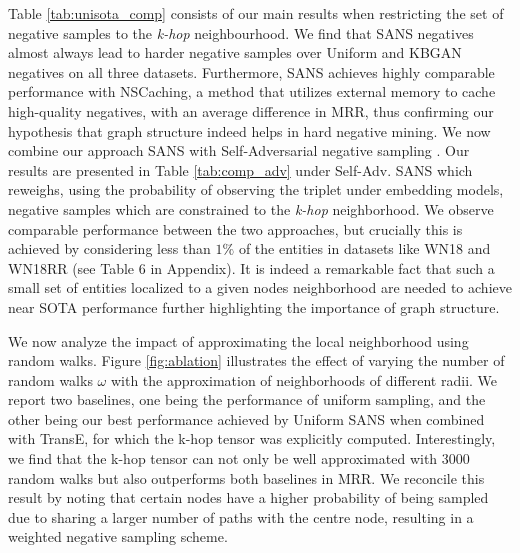  Table \ref{tab:unisota_comp} consists of our main results when restricting the set of negative samples to the \emph{k-hop} neighbourhood. We find that SANS negatives almost always lead to harder negative samples over Uniform and KBGAN negatives on all three datasets. Furthermore, SANS achieves highly comparable performance with NSCaching, a method that utilizes external memory to cache high-quality negatives, with an average  difference in MRR, thus confirming our hypothesis that graph structure indeed helps in hard negative mining.
 We now combine our approach SANS with Self-Adversarial negative sampling \cite{sun2019rotate}. Our results are presented in Table \ref{tab:comp_adv} under Self-Adv. SANS which reweighs, using the probability of observing the triplet under embedding models, negative samples which are constrained to the \emph{k-hop} neighborhood. We observe comparable performance between the two approaches, but crucially this is achieved by considering less than $1\%$ of the entities in datasets like WN18 and WN18RR (see Table 6 in Appendix). It is indeed a remarkable fact that such a small set of entities localized to a given nodes neighborhood are needed to achieve near SOTA performance further highlighting the importance of graph structure.

 We now analyze the impact of approximating the local neighborhood using random walks. Figure \ref{fig:ablation} illustrates the effect of varying the number of random walks $\omega$ with the approximation of neighborhoods of different radii. We report two baselines, one being the performance of uniform sampling, and the other being our best performance achieved by Uniform SANS when combined with TransE, for which the k-hop tensor was explicitly computed. Interestingly, we find that the k-hop tensor can not only be well approximated with 3000 random walks but also outperforms both baselines in MRR. We reconcile this result by noting that certain nodes have a higher probability of being sampled due to sharing a larger number of paths with the centre node, resulting in a weighted negative sampling scheme.

